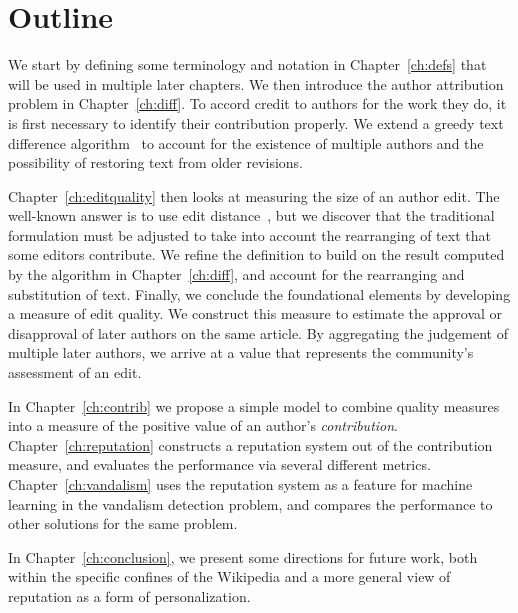 \section{Outline}

We start by defining some terminology and notation in Chapter~\ref{ch:defs}
that will be used in multiple later chapters.
We then introduce the author attribution problem in Chapter~\ref{ch:diff}.
To accord credit to authors for the work they do,
it is first necessary to identify their contribution properly.
We extend a greedy text difference algorithm~\cite{Reichenberger1991,Burns1997} to
account for the existence of multiple authors and the possibility
of restoring text from older revisions.

Chapter~\ref{ch:editquality} then looks at measuring the size of
an author edit.
The well-known answer is to use edit distance~\cite{Levenshtein1966},
but we discover that the traditional formulation must be adjusted
to take into account the rearranging of text that some editors contribute.
We refine the definition to build on the result computed by the
algorithm in Chapter~\ref{ch:diff}, and account for the rearranging
and substitution of text.
Finally, we conclude the foundational elements by developing a measure
of edit quality.
We construct this measure to estimate the approval or disapproval of
later authors on the same article.
By aggregating the judgement of multiple later authors, we arrive at
a value that represents the community's assessment of an edit.

In Chapter~\ref{ch:contrib} we propose a simple model to combine
quality measures into a measure of the positive value of an author's \textit{contribution}.
Chapter~\ref{ch:reputation} constructs a reputation system
out of the contribution measure, and evaluates the performance
via several different metrics.
Chapter~\ref{ch:vandalism} uses the reputation system as a feature
for machine learning in the vandalism detection problem, and compares
the performance to other solutions for the same problem.

In Chapter~\ref{ch:conclusion}, we present some directions for future
work, both within the specific confines of the Wikipedia and a more
general view of reputation as a form of personalization.

